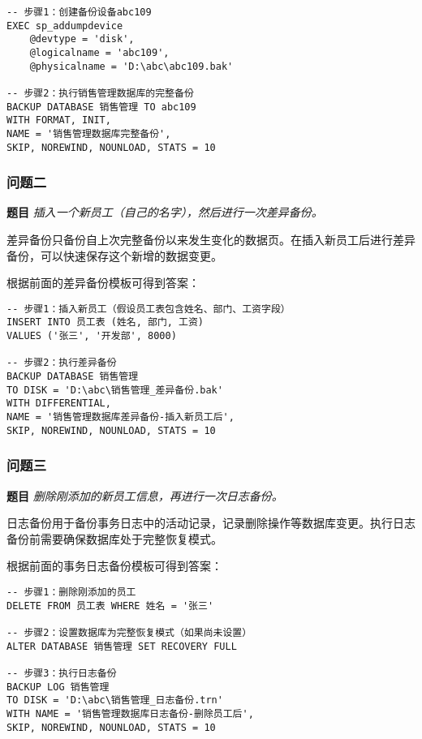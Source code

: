 \begin{mdframed}[backgroundcolor=blue!5]
\begin{verbatim}
-- 步骤1：创建备份设备abc109
EXEC sp_addumpdevice
    @devtype = 'disk',
    @logicalname = 'abc109',
    @physicalname = 'D:\abc\abc109.bak'

-- 步骤2：执行销售管理数据库的完整备份
BACKUP DATABASE 销售管理 TO abc109
WITH FORMAT, INIT,
NAME = '销售管理数据库完整备份',
SKIP, NOREWIND, NOUNLOAD, STATS = 10
\end{verbatim}
\end{mdframed}

\subsubsection{问题二}

\textbf{题目} \emph{插入一个新员工（自己的名字），然后进行一次差异备份。}

\qquad 差异备份只备份自上次完整备份以来发生变化的数据页。在插入新员工后进行差异备份，可以快速保存这个新增的数据变更。

\qquad 根据前面的差异备份模板可得到答案：

\begin{mdframed}[backgroundcolor=blue!5]
\begin{verbatim}
-- 步骤1：插入新员工（假设员工表包含姓名、部门、工资字段）
INSERT INTO 员工表 (姓名, 部门, 工资)
VALUES ('张三', '开发部', 8000)

-- 步骤2：执行差异备份
BACKUP DATABASE 销售管理
TO DISK = 'D:\abc\销售管理_差异备份.bak'
WITH DIFFERENTIAL,
NAME = '销售管理数据库差异备份-插入新员工后',
SKIP, NOREWIND, NOUNLOAD, STATS = 10
\end{verbatim}
\end{mdframed}

\subsubsection{问题三}

\textbf{题目} \emph{删除刚添加的新员工信息，再进行一次日志备份。}

\qquad 日志备份用于备份事务日志中的活动记录，记录删除操作等数据库变更。执行日志备份前需要确保数据库处于完整恢复模式。

\qquad 根据前面的事务日志备份模板可得到答案：

\begin{mdframed}[backgroundcolor=blue!5]
\begin{verbatim}
-- 步骤1：删除刚添加的员工
DELETE FROM 员工表 WHERE 姓名 = '张三'

-- 步骤2：设置数据库为完整恢复模式（如果尚未设置）
ALTER DATABASE 销售管理 SET RECOVERY FULL

-- 步骤3：执行日志备份
BACKUP LOG 销售管理
TO DISK = 'D:\abc\销售管理_日志备份.trn'
WITH NAME = '销售管理数据库日志备份-删除员工后',
SKIP, NOREWIND, NOUNLOAD, STATS = 10
\end{verbatim}
\end{mdframed}

